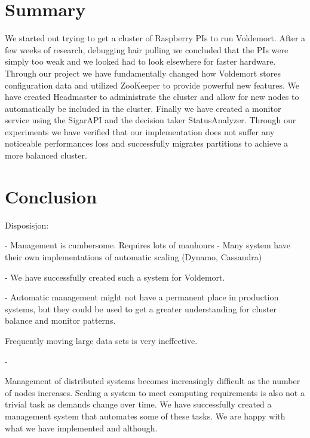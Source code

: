 \section{Summary}
We started out trying to get a cluster of Raspberry PIs to run Voldemort. After a few weeks of research, debugging hair pulling we concluded that the PIs were simply too weak and we looked had to look elsewhere for faster hardware. Through our project we have fundamentally changed how Voldemort stores configuration data and utilized ZooKeeper to provide powerful new features. We have created Headmaster to administrate the cluster and allow for new nodes to automatically be included in the cluster. Finally we have created a monitor service using the SigarAPI and the decision taker StatusAnalyzer. Through our experiments we have verified that our implementation does not suffer any noticeable performances loss and successfully migrates partitions to achieve a more balanced cluster. 

\section{Conclusion}

Disposisjon:
	
	- Management is cumbersome. Requires lots of manhours
	- Many system have their own implementations of automatic scaling (Dynamo, Cassandra)

	- We have successfully created such a system for Voldemort. 

	- Automatic management might not have a permanent place in production systems, but they could be used to get a greater understanding for cluster balance and monitor patterns.

	Frequently moving large data sets is very ineffective. 

	- 

Management of distributed systems becomes increasingly difficult as the number of nodes increases. Scaling a system to meet computing requirements is also not a trivial task as demands change over time. We have successfully created a management system that automates some of these tasks. We are happy with what we have implemented and although. 






